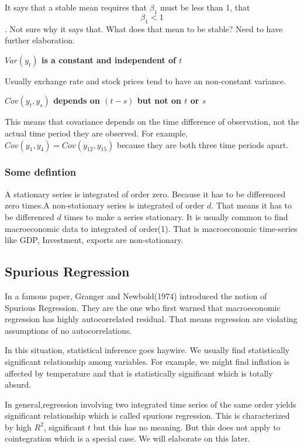 \documentclass{book}
\begin{document}
It says that a stable mean requires that $\beta_1$ must be less than 1, that $$\beta_1 <1$$. Not sure why it says that. What does that mean to be stable? Need to have further elaboration.
 
 \textbf{\normalsize{$Var(y_t)$ is a constant and independent of $t$}} 
 
 Usually exchange rate and stock prices tend to have an non-constant variance. 
 
 \textbf{\normalsize{$Cov(y_t, y_s)$ depends on $(t-s)$ but not on $t$ or $s$}}
 
 This means that covariance depends on the time difference of observation, not the actual time period they are observed. For example, 
 $Cov(y_1, y_4)=Cov(y_{12}, y_{15})$ because they are both three time periods apart. 
 
\subsubsection{Some defintion}
 A stationary series is integrated of order zero. Because it has to be differenced zero times.A non-stationary series is integrated of order $d$. That means it has to be differenced $d$ times to make a series stationary. It is usually common to find macroeconomic data to integrated of order(1). That is macroeconomic time-series like GDP, Investment, exports are non-stationary.
 
\subsection {Spurious Regression}
 In a famous paper, Granger and Newbold(1974) introduced the notion of Spurious Regression. They are the one who first warned that macroeconomic regression has highly autocorrelated residual. That means regression are violating assumptions of no autocorrelations. 
 
 In this situation, statistical inference goes haywire. We usually find statistically significant relationship among variables. For example, we might find inflation is affected by temperature and that is statistically significant which is totally absurd. 
 
 In general,regression involving two integrated time series of the same  order yields significant relationship which is called spurious regression. This is characterized by high $R^2$, significant $t$ but this has no meaning. But this does not apply to cointegration which is a special case. We will elaborate on this later. 
 
\end{document}

